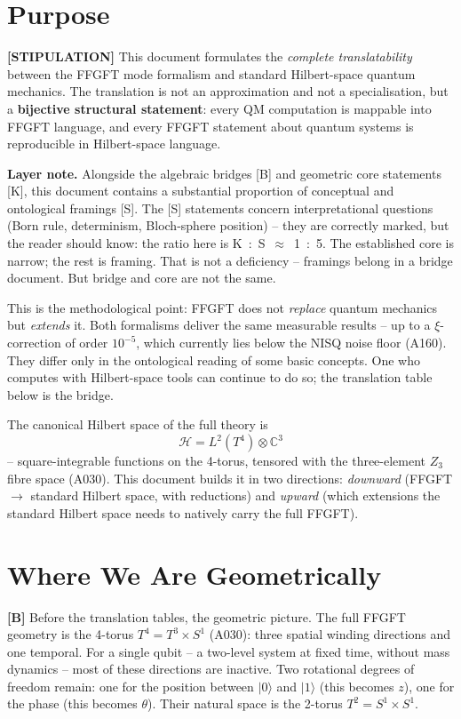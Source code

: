 \section{Purpose}

\textbf{[STIPULATION]} This document formulates the \emph{complete
translatability} between the FFGFT mode formalism and standard Hilbert-space
quantum mechanics. The translation is not an approximation and not a
specialisation, but a \textbf{bijective structural statement}: every QM
computation is mappable into FFGFT language, and every FFGFT statement about
quantum systems is reproducible in Hilbert-space language.

\textbf{Layer note.} Alongside the algebraic bridges [B] and geometric core
statements [K], this document contains a substantial proportion of conceptual
and ontological framings [S]. The [S] statements concern interpretational
questions (Born rule, determinism, Bloch-sphere position) -- they are correctly
marked, but the reader should know: the ratio here is K~:~S~$\approx$~1~:~5.
The established core is narrow; the rest is framing. That is not a deficiency
-- framings belong in a bridge document. But bridge and core are not the same.

This is the methodological point: FFGFT does not \emph{replace} quantum
mechanics but \emph{extends} it. Both formalisms deliver the same measurable
results -- up to a $\xi$-correction of order $10^{-5}$, which currently lies
below the NISQ noise floor (A160). They differ only in the ontological reading
of some basic concepts. One who computes with Hilbert-space tools can continue
to do so; the translation table below is the bridge.

The canonical Hilbert space of the full theory is
\[
  \boxed{\;\mathcal{H} = L^2(T^4)\otimes\mathbb{C}^3\;}
\]
-- square-integrable functions on the 4-torus, tensored with the three-element
$Z_3$ fibre space (A030). This document builds it in two directions: \emph{downward}
(FFGFT $\to$ standard Hilbert space, with reductions) and \emph{upward} (which
extensions the standard Hilbert space needs to natively carry the full FFGFT).

\section{Where We Are Geometrically}

\textbf{[B]} Before the translation tables, the geometric picture. The full
FFGFT geometry is the 4-torus $T^4 = T^3\times S^1$ (A030): three spatial
winding directions and one temporal. For a single qubit -- a two-level system
at fixed time, without mass dynamics -- most of these directions are inactive.
Two rotational degrees of freedom remain: one for the position between $|0\rangle$
and $|1\rangle$ (this becomes $z$), one for the phase (this becomes $\theta$).
Their natural space is the 2-torus $T^2 = S^1\times S^1$.

